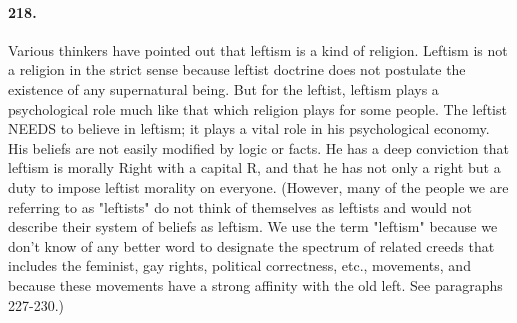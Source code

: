 \documentclass[12pt]{book}
\begin{document}
\paragraph{218.}  Various thinkers have pointed out that leftism is a kind of religion.  Leftism is not a religion in the strict sense because leftist doctrine does not postulate the existence of any supernatural being. But for the leftist, leftism plays a psychological role much like that which religion plays for some people. The leftist NEEDS to believe in leftism; it plays a vital role in his psychological economy. His beliefs are not easily modified by logic or facts.  He has a deep conviction that leftism is morally Right with a capital R, and that he has not only a right but a duty to impose leftist morality on everyone.  (However, many of the people we are referring to as "leftists" do not think of themselves as leftists and would not describe their system of beliefs as leftism. We use the term "leftism" because we don't know of any better word to designate the spectrum of related creeds that includes the feminist, gay rights, political correctness, etc., movements, and because these movements have a strong affinity with the old left. See paragraphs 227-230.)
\end{document}
